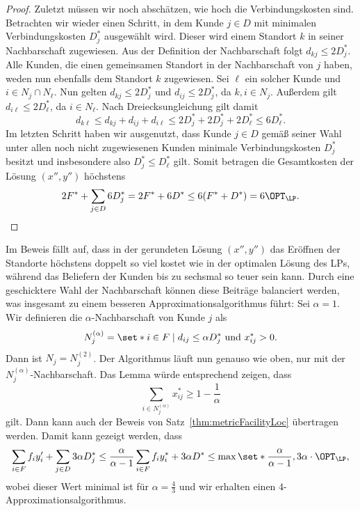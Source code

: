 \documentclass[language=ngerman,algolist]{TemplateLecture}
\begin{document}
\begin{proof}
    Zuletzt müssen wir noch abschätzen, wie hoch die Verbindungskosten sind. Betrachten wir wieder einen Schritt, in dem Kunde $j \in D$ mit minimalen Verbindungskosten $D_j^*$ ausgewählt wird. Dieser wird einem Standort $k$ in seiner Nachbarschaft zugewiesen. Aus der Definition der Nachbarschaft folgt $d_{kj} \leq 2D_j^*$. Alle Kunden, die einen gemeinsamen Standort in der Nachbarschaft von $j$ haben, weden nun ebenfalls dem Standort $k$ zugewiesen. Sei $\ell$ ein solcher Kunde und $i \in N_j \cap N_\ell$. Nun gelten $d_{kj} \leq 2D_j^*$ und $d_{ij} \leq 2D_j^*$, da $k, i \in N_j$. Außerdem gilt $d_{i\ell} \leq 2D_\ell^*$, da $i \in N_\ell$. Nach Dreiecksungleichung gilt damit 
    \begin{equation*}
        d_{k\ell} \leq d_{kj} + d_{ij} + d_{i\ell} \leq 2 D_j^* + 2 D_j^* + 2 D_\ell^* \leq 6 D_\ell^*.
    \end{equation*}
    Im letzten Schritt haben wir ausgenutzt, dass Kunde $j \in D$ gemäß seiner Wahl unter allen noch nicht zugewiesenen Kunden minimale Verbindungskosten $D_j^*$ besitzt und insbesondere also  $D_j^* \leq D_\ell^*$ gilt. Somit betragen die Gesamtkosten der Lösung $(x'', y'')$ höchstens 
    \begin{equation*}
        2F^* + \sum_{j \in D} 6D_j^* = 2F^* + 6D^* \leq 6(F^* + D^*) = 6 \OPT_{\LP}. \qedhere
    \end{equation*}
\end{proof}

Im Beweis fällt auf, dass in der gerundeten Lösung $(x'', y'')$ das Eröffnen der Standorte höchstens doppelt so viel kostet wie in der optimalen Lösung des LPs, während das Beliefern der Kunden bis zu sechsmal so teuer sein kann. Durch eine geschicktere Wahl der Nachbarschaft können diese Beiträge balanciert werden, was insgesamt zu einem besseren Approximationsalgorithmus führt: Sei $\alpha = 1$. Wir definieren die $\alpha$-Nachbarschaft von Kunde $j$ als 
\begin{equation*}
    N_j^{(\alpha)} = \set*{i \in F \mid d_{ij} \leq \alpha D_j^* \text{ und } x_{ij}^* > 0}.
\end{equation*} 
Dann ist $N_j = N_j^{(2)}$. Der Algorithmus läuft nun genauso wie oben, nur mit der $N_j^{(\alpha)}$-Nachbarschaft. Das Lemma würde entsprechend zeigen, dass 
\begin{equation*}
    \sum_{i \in N_j^{(\alpha)}} x_{ij}^* \geq 1 - \frac{1}{\alpha}
\end{equation*}
gilt. Dann kann auch der Beweis von Satz~\ref{thm:metricFacilityLoc} übertragen werden. Damit kann gezeigt werden, dass 
\begin{equation*}
    \sum_{i \in F} f_i y_i' + \sum_{j \in D} 3\alpha D_j^* \leq \frac{\alpha}{\alpha - 1} \sum_{i \in F} f_i y_i^* + 3\alpha D^* \leq \max\set*{\frac{\alpha}{\alpha - 1}, 3\alpha} \cdot \OPT_{\LP},
\end{equation*}
wobei dieser Wert minimal ist für $\alpha = \frac{4}{3}$ und wir erhalten einen $4$-Approximationsalgorithmus.
\end{document}
